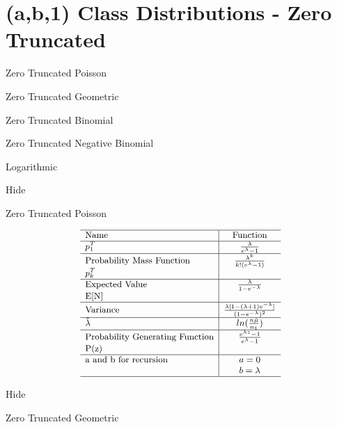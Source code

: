 \documentclass[]{book}
\begin{document}
\section{(a,b,1) Class Distributions - Zero
Truncated}\label{ab1-class-distributions---zero-truncated}

Zero Truncated Poisson

Zero Truncated Geometric

Zero Truncated Binomial

Zero Truncated Negative Binomial

Logarithmic

\hypertarget{ztA}{}
{Hide}

Zero Truncated Poisson

\[
{\small
\begin{matrix}
\begin{array}{l|c}
\hline
  \text{Name} & \text{Function} \\
\hline
  p^T_1 & \frac{\lambda}{e^\lambda-1} \\
\hline
  \text{Probability Mass Function} & \frac{\lambda^k}{k!(e^\lambda-1)} \\
  p^T_k & \\
\hline
  \text{Expected Value} & \frac{\lambda}{1-e^{-\lambda}} \\
  \mathrm{E[N]} & \\
\hline
  \text{Variance} & \frac{\lambda[1-(\lambda+1)e^{-\lambda}]}{(1-e^{-\lambda})^2} \\
\hline
  \tilde\lambda & ln(\frac{n\hat\mu}{n_1}) \\
\hline
  \text{Probability Generating Function} & \frac{e^{\lambda z}-1}{e^\lambda-1} \\
  \mathrm{P(z)} & \\
\hline
  \text{a and b for recursion} & a=0 \\
   & b=\lambda \\
\hline
\end{array}
\end{matrix}
}
\]

\hypertarget{ztB}{}
{Hide}

Zero Truncated Geometric
\end{document}

